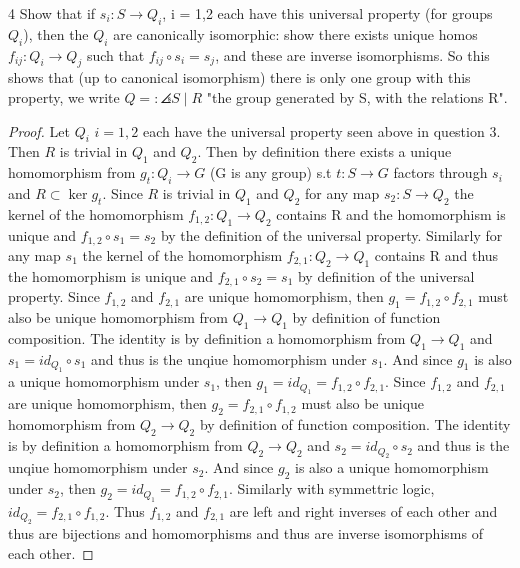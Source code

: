 \documentclass{article}
\begin{document}
\begin{PROB}{4}\label{Problem 4.}
    Show that if $s_i: S \to Q_i$, i = 1,2 each have this universal property (for groups $Q_i$), then the $Q_i$ are canonically isomorphic: show there exists unique homos $f_{ij}: Q_i \to Q_j$ such that $f_{ij} \circ s_i = s_j$, and these are inverse isomorphisms.  So this shows that (up to canonical isomorphism) there is only one group with this property, we write $Q =: \angles{S \mid R}$ "the group generated by S, with the relations R". 
\end{PROB}
\begin{proof}
    Let $Q_i$ $i = 1, 2$ each have the universal property seen above in question 3. Then $R$ is trivial in $Q_1$ and $Q_2$. Then by definition there exists a unique homomorphism from $g_t: Q_i \to G$ (G is any group) s.t $t: S \to G$ factors through $s_i$ and $R \subset \ker g_t$. Since $R$ is trivial in $Q_1$ and $Q_2$ for any map $s_2: S \to Q_2$ the kernel of the homomorphism $f_{1,2}: Q_1 \to Q_2$ contains R and the homomorphism is unique and $f_{1, 2} \circ s_1 = s_2 $ by the definition of the universal property. Similarly for any map $s_1$ the kernel of the homomorphism $f_{2,1}: Q_2 \to Q_1$ contains R and thus the homomorphism is unique and $f_{2, 1} \circ s_2 = s_1$ by definition of the universal property. Since $f_{1, 2}$ and $f_{2, 1}$ are unique homomorphism, then $g_1 = f_{1, 2} \circ f_{2, 1}$ must also be unique homomorphism from $Q_1 \to Q_1$ by definition of function composition. The identity is by definition a homomorphism from $Q_1 \to Q_1$ and $s_1 = id_{Q_1} \circ s_1$ and thus is the unqiue homomorphism under $s_1$. And since $g_1$ is also a unique homomorphism under $s_1$, then $g_1 = id_{Q_1} = f_{1, 2} \circ f_{2, 1}$. Since $f_{1, 2}$ and $f_{2, 1}$ are unique homomorphism, then $g_2 = f_{2, 1} \circ f_{1, 2}$ must also be unique homomorphism from $Q_2 \to Q_2$ by definition of function composition. The identity is by definition a homomorphism from $Q_2 \to Q_2$ and $s_2 = id_{Q_2} \circ s_2$ and thus is the unqiue homomorphism under $s_2$. And since $g_2$ is also a unique homomorphism under $s_2$, then $g_2 = id_{Q_1} = f_{1, 2} \circ f_{2, 1}$. Similarly with symmettric logic, $id_{Q_2} = f_{2, 1} \circ f_{1, 2}$. Thus $f_{1, 2}$ and $f_{2, 1}$ are left and right inverses of each other and thus are bijections and homomorphisms and thus are inverse isomorphisms of each other.
\end{proof}

\bigskip
\end{document}
